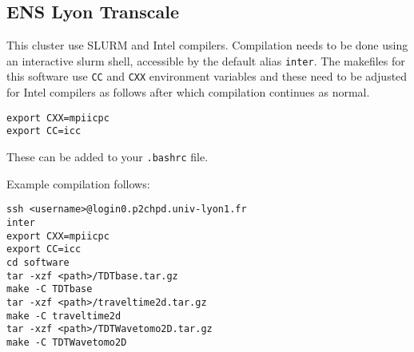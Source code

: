 \documentclass[a4paper,12pt]{article}
\begin{document}
\subsection{ENS Lyon Transcale}

This cluster use SLURM and Intel compilers. Compilation needs to be
done using an interactive slurm shell, accessible by the
default alias {\tt inter}. The makefiles for this software use
{\tt CC} and {\tt CXX} environment variables and these need
to be adjusted for Intel compilers as follows after which
compilation continues as normal.

\begin{verbatim}
export CXX=mpiicpc
export CC=icc
\end{verbatim}

These can be added to your {\tt .bashrc} file.

Example compilation follows:

\begin{verbatim}
ssh <username>@login0.p2chpd.univ-lyon1.fr
inter
export CXX=mpiicpc
export CC=icc
cd software
tar -xzf <path>/TDTbase.tar.gz
make -C TDTbase
tar -xzf <path>/traveltime2d.tar.gz
make -C traveltime2d
tar -xzf <path>/TDTWavetomo2D.tar.gz
make -C TDTWavetomo2D
\end{verbatim}



\end{document}
